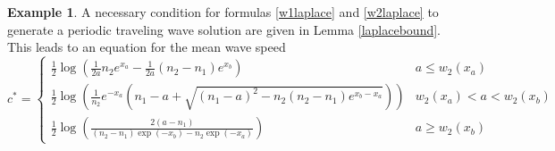\documentclass[11pt]{article}
\theoremstyle{definition}
\newtheorem{ex}[thm]{Example}
\numberwithin{equation}{section}
\numberwithin{thm}{section}
\renewcommand{\a}{a}
\renewcommand{\b}{b}
\newcommand{\m}{n_1}
\newcommand{\mtwo}{n_2}
\begin{document}
\begin{ex}
A necessary condition for formulas \eqref{w1laplace} and \eqref{w2laplace} to generate a periodic traveling wave solution are given in Lemma \ref{laplacebound}. This leads to an equation for the mean wave speed
\begin{equation}
c^* = \begin{cases}
\frac{1}{2} \log \left( \frac{1}{2\a} \mtwo e^{x_\a} - \frac{1}{2\a}(\mtwo-\m)e^{x_\b} \right) & \a \leq w_2(x_\a) \\
\frac{1}{2} \log \left( \frac{1}{\mtwo} e^{-x_\a} \left( \m - \a + \sqrt{(\m-\a)^2-\mtwo(\mtwo-\m)e^{x_\b-x_\a}}\right)\right) & w_2(x_\a) < \a < w_2(x_\b) \\
\frac{1}{2} \log \left( \frac{2(\a-\m)}{(\mtwo-\m)\exp(-x_\b)-\mtwo \exp(-x_\a)}\right) & \a \geq w_2(x_\b)
\end{cases} 
\end{equation}
%
%
\newcommand{\Conecaseone}{\b(1-\m)-\a}
\newcommand{\Conecasetwo}{\frac{1-\m-4\a(1-\b)}{4(1-\b)}}
\newcommand{\Conecasethree}{- \frac{1-\b+\m(1-\a)}{4(1-\a)(1-\b)} }
%
%
\newcommand{\Ctwocaseone}{\a}
\newcommand{\Ctwocasetwo}{\frac{1}{4(1-\a)}}
%

\end{ex}
\end{document}

